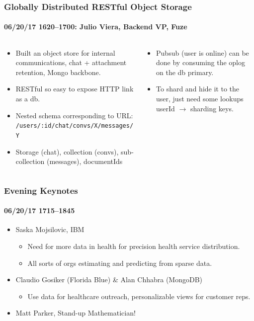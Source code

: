\documentclass[xcolor=dvipsnames, 9pt]{beamer}
\begin{document}
\begin{frame}
    \frametitle{Globally Distributed RESTful Object Storage}
    \framesubtitle{%
        06/20/17 1620--1700:
        Julio Viera, Backend VP, Fuze
    }
    \begin{columns}
        \begin{column}{0.5\textwidth}
            \begin{itemize}
                \item Built an object store for internal communications, chat +
                    attachment retention, Mongo backbone.
                \item RESTful so easy to expose HTTP link as a db.
                \item Nested schema corresponding to URL:\@
                    {\small\texttt{/users/:id/chat/convs/X/messages/Y}}
                \item Storage (chat), collection (convs), sub-collection
                    (messages), documentIds
            \end{itemize}
        \end{column}
        \begin{column}{0.5\textwidth}
            \begin{itemize}
                \item Pubsub (user is online) can be done by consuming the oplog
                    on the db primary.
                \item To shard and hide it to the user, just need some lookups
                    userId $\to$ sharding keys.
            \end{itemize}
        \end{column}
    \end{columns}
\end{frame}

\begin{frame}
    \frametitle{Evening Keynotes}
    \framesubtitle{06/20/17 1715--1845}

    \begin{itemize}
        \item Saska Mojsilovic, IBM
            \begin{itemize}
                \item Need for more data in health for precision health
                    service distribution.
                \item All sorts of orgs estimating and predicting from
                    sparse data.
            \end{itemize}
        \item Claudio Gosiker (Florida Blue) \& Alan Chhabra (MongoDB)
            \begin{itemize}
                \item Use data for healthcare outreach, personalizable
                    views for customer reps.
            \end{itemize}
        \item Matt Parker, Stand-up Mathematician!
    \end{itemize}
\end{frame}
\end{document}
